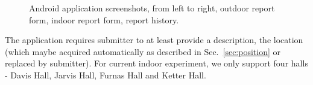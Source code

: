 \documentclass{acm_proc_article-sp}
\begin{document}
\begin{figure}[!t]
 \caption{Android application screenshots, from left to right, outdoor report form, indoor report form, report history.} \label{fig:form}
 \end{figure}
 The application requires submitter to at least provide a description, the location (which maybe acquired automatically as described in 
 Sec.~\ref{sec:position} or replaced by submitter). For current indoor experiment, we only support four halls - Davis Hall, Jarvis Hall, 
 Furnas Hall and Ketter Hall.
\end{document}
